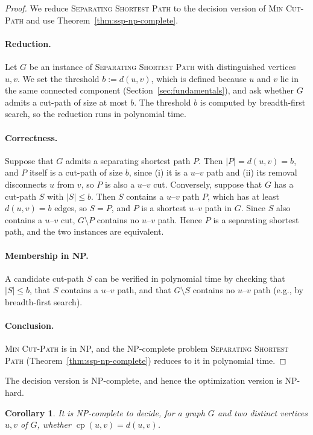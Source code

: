 \documentclass[a4paper,fleqn]{cas-sc}
\numberwithin{equation}{section}
\theoremstyle{definition}
\theoremstyle{plain}
\newtheorem{corollary}[definition]{Corollary}
\theoremstyle{remark}
\newcommand{\cp}{\operatorname{cp}}                  %
\newcommand{\MinCutPath}{\textsc{Min Cut-Path}}
\newcommand{\SSP}{\textsc{Separating Shortest Path}}
\begin{document}
\begin{proof}
We reduce \SSP{} to the decision version of \MinCutPath{} and use Theorem~\ref{thm:ssp-np-complete}.

\paragraph{Reduction.}
Let $G$ be an instance of \SSP{} with distinguished vertices $u,v$.
We set the threshold $b := d(u,v)$, which is defined because $u$ and $v$ lie in the same connected component (Section~\ref{sec:fundamentals}), and ask whether $G$ admits a cut-path of size at most $b$.
The threshold $b$ is computed by breadth-first search, so the reduction runs in polynomial time.

\paragraph{Correctness.}
Suppose that $G$ admits a separating shortest path $P$.
Then $|P| = d(u,v) = b$, and $P$ itself is a cut-path of size $b$, since (i) it is a $u$--$v$ path and (ii) its removal disconnects $u$ from $v$, so $P$ is also a $u$--$v$ cut.
Conversely, suppose that $G$ has a cut-path $S$ with $|S| \leq b$.
Then $S$ contains a $u$--$v$ path $P$, which has at least $d(u,v) = b$ edges, so $S = P$, and $P$ is a shortest $u$--$v$ path in $G$.
Since $S$ also contains a $u$--$v$ cut, $G \setminus P$ contains no $u$--$v$ path.
Hence $P$ is a separating shortest path, and the two instances are equivalent.

\paragraph{Membership in NP.}
A candidate cut-path $S$ can be verified in polynomial time by checking that $|S| \leq b$, that $S$ contains a $u$--$v$ path, and that $G\setminus S$ contains no $u$--$v$ path (e.g., by breadth-first search).

\paragraph{Conclusion.}
\MinCutPath{} is in NP, and the NP-complete problem \SSP{} (Theorem~\ref{thm:ssp-np-complete}) reduces to it in polynomial time.
\end{proof}

The decision version is NP-complete, and hence the optimization version is NP-hard.

\begin{corollary}
\label{cor:lower-bound-attained}
It is NP-complete to decide, for a graph $G$ and two distinct vertices $u, v$ of $G$, whether $\cp(u, v) = d(u, v)$.
\end{corollary}
\end{document}
